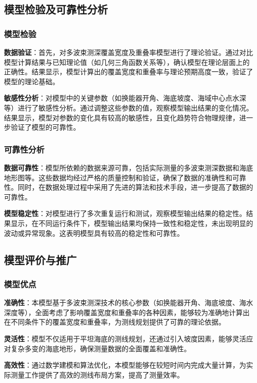 \documentclass{cumcmthesis}
\begin{document}
\subsection{模型检验及可靠性分析}
\subsubsection{模型检验}

\textbf{数据验证}：首先，对多波束测深覆盖宽度及重叠率模型进行了理论验证。通过对比模型计算结果与已知理论值（如几何三角函数关系等），确认模型在理论层面上的正确性。结果显示，模型计算出的覆盖宽度和重叠率与理论预期高度一致，验证了模型的理论基础。

\textbf{敏感性分析}：对模型中的关键参数（如换能器开角、海底坡度、海域中心点水深等）进行了敏感性分析。通过调整这些参数的值，观察模型输出结果的变化情况。结果显示，模型对参数的变化具有较高的敏感性，且变化趋势符合物理规律，进一步验证了模型的可靠性。

\subsubsection{可靠性分析}

\textbf{数据可靠性}：模型所依赖的数据来源可靠，包括实际测量的多波束测深数据和海底地形图等。这些数据均经过严格的质量控制和验证，确保了数据的准确性和可靠性。同时，在数据处理过程中采用了先进的算法和技术手段，进一步提高了数据的可靠性。

\textbf{模型稳定性}：对模型进行了多次重复运行和测试，观察模型输出结果的稳定性。结果显示，在不同运行条件下，模型输出结果均保持一致性和稳定性，未出现明显的波动或异常现象。这表明模型具有较高的稳定性和可靠性。

\subsection{模型评价与推广}
\subsubsection{模型优点}
\textbf{准确性}：本模型基于多波束测深技术的核心参数（如换能器开角、海底坡度、海水深度等），全面考虑了影响覆盖宽度和重叠率的各种因素，能够较为准确地计算出在不同条件下的覆盖宽度和重叠率，为测线规划提供了可靠的理论依据。

\textbf{灵活性}：模型不仅适用于平坦海底的测线规划，还通过引入坡度因素，能够灵活应对复杂多变的海底地形，确保测量数据的全面覆盖和准确性。

\textbf{高效性}：通过数学建模和算法优化，本模型能够在较短时间内完成大量计算，为实际测量工作提供了高效的测线布局方案，提高了测量效率。
\end{document}
